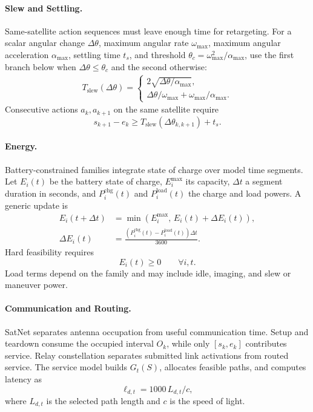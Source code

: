 \documentclass[11pt]{article}
\begin{document}
\paragraph{Slew and Settling.} Same-satellite action sequences must leave enough time for retargeting. For a scalar angular change \(\Delta\theta\), maximum angular rate \(\omega_{\max}\), maximum angular acceleration \(\alpha_{\max}\), settling time \(t_s\), and threshold \(\theta_c=\omega_{\max}^2/\alpha_{\max}\), use the first branch below when \(\Delta\theta\le\theta_c\) and the second otherwise:
\[
  \begin{aligned}
  T_{\mathrm{slew}}(\Delta\theta)=
  \begin{cases}
    2\sqrt{\Delta\theta/\alpha_{\max}},\\
    \Delta\theta/\omega_{\max}+\omega_{\max}/\alpha_{\max}.
  \end{cases}
  \end{aligned}
\]
Consecutive actions \(a_k,a_{k+1}\) on the same satellite require
\[
  s_{k+1}-e_k\ge T_{\mathrm{slew}}(\Delta\theta_{k,k+1})+t_s.
\]

\paragraph{Energy.} Battery-constrained families integrate state of charge over model time segments. Let \(E_i(t)\) be the battery state of charge, \(E_i^{\max}\) its capacity, \(\Delta t\) a segment duration in seconds, and \(P_i^{\mathrm{chg}}(t)\) and \(P_i^{\mathrm{load}}(t)\) the charge and load powers. A generic update is
\[
  \begin{aligned}
  E_i(t+\Delta t)&=\min(E_i^{\max},\,E_i(t)+\Delta E_i(t)),\\
  \Delta E_i(t)&=\frac{(P^{\mathrm{chg}}_i(t)-P^{\mathrm{load}}_i(t))\Delta t}{3600}.
  \end{aligned}
\]
Hard feasibility requires
\[
  E_i(t)\ge 0\qquad\forall i,t.
\]
Load terms depend on the family and may include idle, imaging, and slew or maneuver power.

\paragraph{Communication and Routing.} SatNet separates antenna occupation from useful communication time. Setup and teardown consume the occupied interval \(O_k\), while only \([s_k,e_k]\) contributes service. Relay constellation separates submitted link activations from routed service. The service model builds \(G_t(S)\), allocates feasible paths, and computes latency as
\[
  \ell_{d,t}=1000\,L_{d,t}/c,
\]
where \(L_{d,t}\) is the selected path length and \(c\) is the speed of light.
\end{document}
